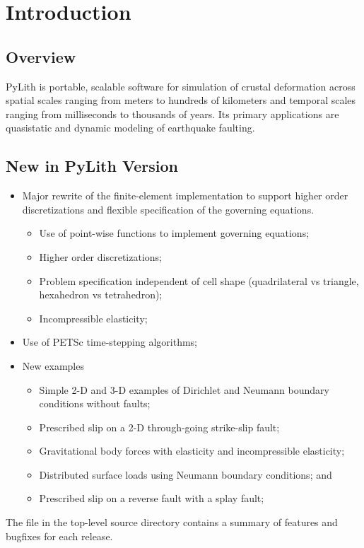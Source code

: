 \chapter{Introduction}


\section{Overview}

PyLith is portable, scalable software for simulation of crustal
deformation across spatial scales ranging from meters to hundreds of
kilometers and temporal scales ranging from milliseconds to thousands
of years. Its primary applications are quasistatic and dynamic
modeling of earthquake faulting.

\section{New in PyLith Version \pylithVersionNumber}
\begin{itemize}
\item Major rewrite of the finite-element implementation to support
  higher order discretizations and flexible specification of the
  governing equations.
  \begin{itemize}
  \item Use of point-wise functions to implement governing equations;
  \item Higher order discretizations;
  \item Problem specification independent of cell shape (quadrilateral
    vs triangle, hexahedron vs tetrahedron);
  \item Incompressible elasticity;
  \end{itemize}
\item Use of PETSc time-stepping algorithms;
\item New examples
  \begin{itemize}
  \item Simple 2-D and 3-D examples of Dirichlet and Neumann boundary
    conditions without faults;
  \item Prescribed slip on a 2-D through-going strike-slip fault;
  \item Gravitational body forces with elasticity and incompressible
    elasticity;
  \item Distributed surface loads using Neumann boundary conditions;
    and
  \item Prescribed slip on a reverse fault with a splay fault;
  \end{itemize}
\end{itemize}
The  file in the top-level source directory contains
a summary of features and bugfixes for each release.


